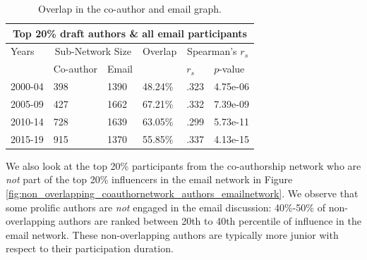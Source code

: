 \documentclass[twocolumn,10pt]{article}
\begin{document}
\begin{table}
  \small 
  \begin{tabular}{llllll}
    \toprule
    \multicolumn{6}{c}{Top 20\% draft authors \& all email participants}\\ \midrule
                    
    Years   & \multicolumn{2}{c}{Sub-Network Size} & Overlap  & \multicolumn{2}{c}{Spearman's $r_{s}$} \\ \cline{2-3}  \cline{5-6}
        &   Co-author & Email  &  &   $r_{s}$   & $p$-value \\ \midrule
        
    2000-04   &   398 &   1390 &   48.24\%  &  .323 &   4.75e-06 \\
    2005-09   &   427 &   1662 &   67.21\% &   .332   &   7.39e-09    \\
    2010-14   &   728 &   1639 &   63.05\% &   .299   &   5.73e-11  \\
    2015-19   &   915 &   1370 &   55.85\%  &   .337   &   4.13e-15  \\ %
       
    \bottomrule
  \end{tabular}
  \caption{
    Overlap in the co-author and email graph.
  }
  \label{tbl:correlation_sprmn}
\end{table}

We also look at the top 20\% participants from the co-authorship network
who are \emph{not} part of the top 20\% influencers in the email network in
Figure \ref{fig:non_overlapping_coauthornetwork_authors_emailnetwork}.
We observe that some prolific authors are \emph{not} engaged
in the email discussion: 40\%-50\% of non-overlapping authors are ranked
between 20th to 40th percentile of influence in the email network. These
non-overlapping authors are typically more junior with respect to their
participation duration.
\end{document}
